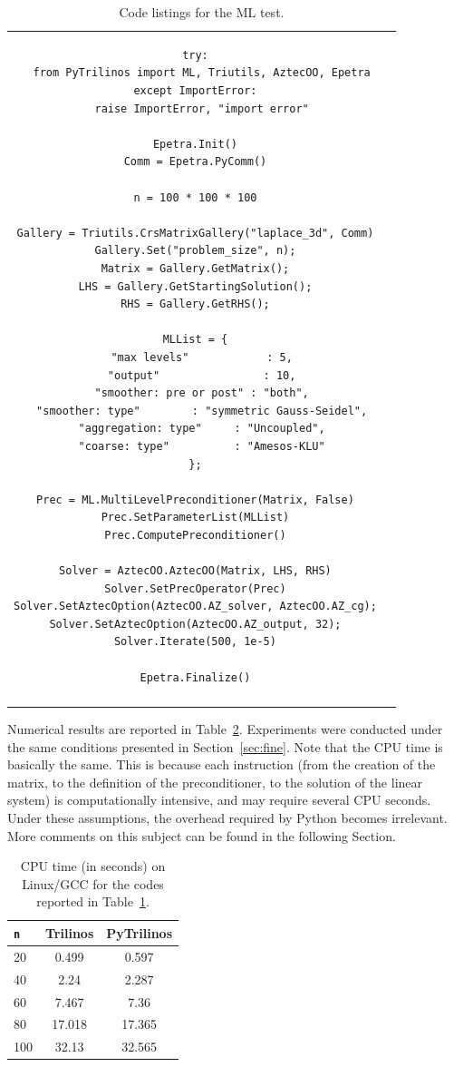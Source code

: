 \documentclass[10pt,relax]{SANDreport}
\begin{document}
\begin{table}
\begin{tabular}{| c  | c|}
\begin{minipage}{10.5cm}
\begin{verbatim}
try:
  from PyTrilinos import ML, Triutils, AztecOO, Epetra
except ImportError:
  raise ImportError, "import error"

Epetra.Init()
Comm = Epetra.PyComm()

n = 100 * 100 * 100

Gallery = Triutils.CrsMatrixGallery("laplace_3d", Comm)
Gallery.Set("problem_size", n);
Matrix = Gallery.GetMatrix();
LHS = Gallery.GetStartingSolution();
RHS = Gallery.GetRHS();

MLList = {
  "max levels"            : 5,
  "output"                : 10,
  "smoother: pre or post" : "both",
  "smoother: type"        : "symmetric Gauss-Seidel",
  "aggregation: type"     : "Uncoupled",
  "coarse: type"          : "Amesos-KLU"
};

Prec = ML.MultiLevelPreconditioner(Matrix, False)
Prec.SetParameterList(MLList)
Prec.ComputePreconditioner()

Solver = AztecOO.AztecOO(Matrix, LHS, RHS)
Solver.SetPrecOperator(Prec)
Solver.SetAztecOption(AztecOO.AZ_solver, AztecOO.AZ_cg);
Solver.SetAztecOption(AztecOO.AZ_output, 32);
Solver.Iterate(500, 1e-5)

Epetra.Finalize()
\end{verbatim}
\end{minipage}
\\
&  \\
\hline
\end{tabular}
\caption{Code listings for the ML test.}
\label{tab:code_ml}
\end{table}

Numerical results are reported in Table~\ref{tab:time_ml}. Experiments were
conducted under the same conditions presented in Section~\ref{sec:fine}. Note
that the CPU time is basically the same. This is because each instruction
(from the creation of the matrix, to the definition of the preconditioner, to
 the solution of the linear system) is computationally intensive, and may
require several CPU seconds. Under these assumptions, the overhead required by
Python becomes irrelevant. More comments on this subject can be found in the
following Section.

\begin{table}
\begin{center}
\begin{tabular}{| l | c | c |}
\hline
\tt n & Trilinos & PyTrilinos \\
\hline
20  & 0.499  & 0.597 \\
40  & 2.24   & 2.287 \\
60  & 7.467  & 7.36 \\
80  & 17.018 & 17.365 \\
100 & 32.13  & 32.565 \\
\hline
\end{tabular}
\caption{CPU time (in seconds) on Linux/GCC for the codes reported in
Table~\ref{tab:code_ml}.}
\label{tab:time_ml}
\end{center}
\end{table}
\end{document}
